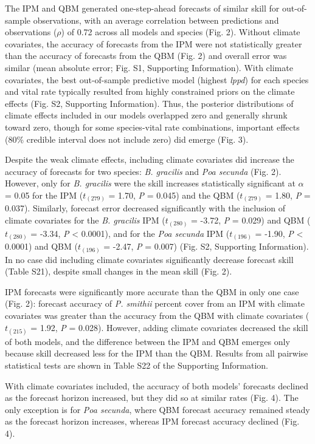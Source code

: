 \documentclass[12pt,]{article}
\begin{document}
The IPM and QBM generated one-step-ahead forecasts of similar skill for
out-of-sample observations, with an average correlation between
predictions and observations (\(\rho\)) of 0.72 across all models and
species (Fig. 2). Without climate covariates, the accuracy of forecasts
from the IPM were not statistically greater than the accuracy of
forecasts from the QBM (Fig. 2) and overall error was similar (mean
absolute error; Fig. S1, Supporting Information). With climate
covariates, the best out-of-sample predictive model (highest
\emph{lppd}) for each species and vital rate typically resulted from
highly constrained priors on the climate effects (Fig. S2, Supporting
Information). Thus, the posterior distributions of climate effects
included in our models overlapped zero and generally shrunk toward zero,
though for some species-vital rate combinations, important effects (80\%
credible interval does not include zero) did emerge (Fig. 3).

Despite the weak climate effects, including climate covariates did
increase the accuracy of forecasts for two species: \emph{B. gracilis}
and \emph{Poa secunda} (Fig. 2). However, only for \emph{B. gracilis}
were the skill increases statistically significant at \(\alpha\) = 0.05
for the IPM (\(t_{(279)}\) = 1.70, \emph{P} = 0.045) and the QBM
(\(t_{(279)}\) = 1.80, \emph{P} = 0.037). Similarly, forecast error
decreased significantly with the inclusion of climate covariates for the
\emph{B. gracilis} IPM (\(t_{(280)}\) = -3.72, \emph{P} = 0.029) and QBM
(\(t_{(280)}\) = -3.34, \emph{P} \textless{} 0.0001), and for the
\emph{Poa secunda} IPM (\(t_{(196)}\) = -1.90, \emph{P} \textless{}
0.0001) and QBM (\(t_{(196)}\) = -2.47, \emph{P} = 0.007) (Fig. S2,
Supporting Information). In no case did including climate covariates
significantly decrease forecast skill (Table S21), despite small changes
in the mean skill (Fig. 2).

IPM forecasts were significantly more accurate than the QBM in only one
case (Fig. 2): forecast accuracy of \emph{P. smithii} percent cover from
an IPM with climate covariates was greater than the accuracy from the
QBM with climate covariates (\(t_{(215)}\) = 1.92, \emph{P} = 0.028).
However, adding climate covariates decreased the skill of both models,
and the difference between the IPM and QBM emerges only because skill
decreased less for the IPM than the QBM. Results from all pairwise
statistical tests are shown in Table S22 of the Supporting Information.

With climate covariates included, the accuracy of both models' forecasts
declined as the forecast horizon increased, but they did so at similar
rates (Fig. 4). The only exception is for \emph{Poa secunda}, where QBM
forecast accuracy remained steady as the forecast horizon increases,
whereas IPM forecast accuracy declined (Fig. 4).
\end{document}
